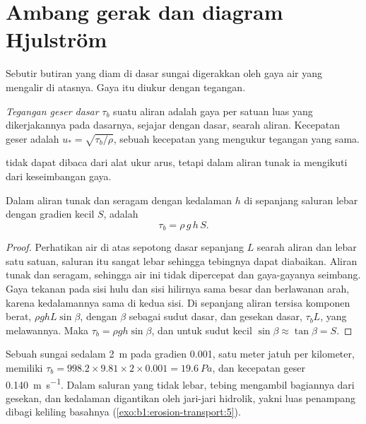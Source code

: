 \section{Ambang gerak dan diagram Hjulström}\label{sec:b1:erosion-transport:threshold}

Sebutir butiran yang diam di dasar sungai digerakkan oleh gaya air yang mengalir di atasnya. Gaya itu diukur dengan tegangan.

\begin{definition}\label{def:b1:erosion-transport:bed-shear}
\emph{Tegangan geser dasar} $\tau_b$ suatu aliran adalah gaya per satuan luas yang dikerjakannya pada dasarnya, sejajar dengan dasar, searah aliran. Kecepatan geser adalah $u_* = \sqrt{\tau_b/\rho}$, sebuah kecepatan yang mengukur tegangan yang sama.
\end{definition}

 tidak dapat dibaca dari alat ukur arus, tetapi dalam aliran tunak ia mengikuti dari keseimbangan gaya.

\begin{proposition}\label{prop:b1:erosion-transport:depth-slope}
Dalam aliran tunak dan seragam dengan kedalaman $h$ di sepanjang saluran lebar dengan gradien kecil $S$,  adalah
\[
  \tau_b = \rho\,g\,h\,S .
\]
\end{proposition}

\begin{proof}
Perhatikan air di atas sepotong dasar sepanjang $L$ searah aliran dan lebar satu satuan, saluran itu sangat lebar sehingga tebingnya dapat diabaikan. Aliran
tunak dan seragam, sehingga air ini tidak dipercepat dan gaya-gayanya seimbang. Gaya tekanan pada sisi hulu dan sisi hilirnya sama besar dan berlawanan arah, karena kedalamannya sama di kedua sisi. Di sepanjang aliran tersisa komponen berat,
$\rho g h L \sin\beta$, dengan $\beta$ sebagai sudut dasar, dan gesekan dasar, $\tau_b L$, yang melawannya. Maka $\tau_b
= \rho g h \sin\beta$, dan untuk sudut kecil $\sin\beta \approx \tan\beta = S$.
\end{proof}

Sebuah sungai sedalam \qty{2}{m} pada gradien \num{0.001}, satu meter jatuh per kilometer, memiliki $\tau_b = 998.2 \times 9.81 \times 2 \times 0.001 =
\qty{19.6}{Pa}$, dan kecepatan geser \qty{0.140}{m.s^{-1}}. Dalam saluran yang tidak lebar, tebing mengambil bagiannya dari gesekan, dan kedalaman digantikan oleh jari-jari hidrolik, yakni luas penampang dibagi keliling basahnya (\cref{exo:b1:erosion-transport:5}).

